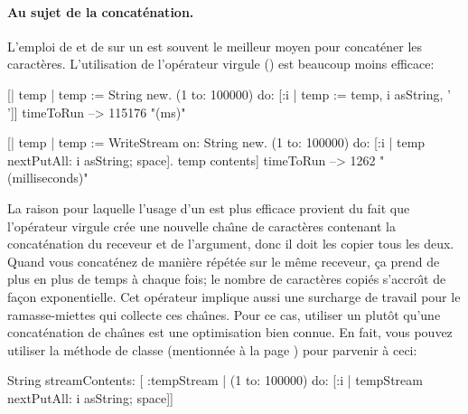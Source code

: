 \documentclass[a4paper,10pt,twoside]{book}
\begin{document}
\paragraph{Au sujet de la concat\'enation.}
L'emploi de  et de  sur un  est souvent le meilleur moyen pour concat\'ener 
les caract\`eres.
L'utilisation de l'op\'erateur virgule (\ct{,}) est beaucoup moins efficace:

\begin{code}{}
[| temp |
  temp := String new.
  (1 to: 100000)
    do: [:i | temp := temp, i asString, ' ']] timeToRun --> 115176 "(ms)"

[| temp |
  temp := WriteStream on: String new.
  (1 to: 100000)
    do: [:i | temp nextPutAll: i asString; space].
  temp contents] timeToRun --> 1262 "(milliseconds)"
\end{code}

La raison pour laquelle l'usage d'un \stream est plus efficace provient
du fait que l'op\'erateur virgule cr\'ee une nouvelle cha\^{\i}ne de caract\`eres
contenant la concat\'enation du receveur et de l'argument, donc il doit
les copier tous les deux.
Quand vous concat\'enez de mani\`ere r\'ep\'et\'ee sur le m\^eme receveur,
	  \c{c}a prend de plus en plus de temps \`a chaque fois; le nombre
	  de caract\`eres copi\'es s'accro\^{\i}t de fa\c{c}on exponentielle.
Cet op\'erateur implique aussi une surcharge de travail pour le ramasse-miettes qui collecte ces cha\^{\i}nes. 
Pour ce cas, utiliser un \stream plut\^ot qu'une concat\'enation de cha\^{\i}nes est une optimisation bien connue.
En fait, vous pouvez utiliser la m\'ethode de classe  (mentionn\'ee \`a la page \pageref{sec:streamContents}) pour parvenir \`a ceci:

\begin{code}{}
String streamContents: [ :tempStream |
  (1 to: 100000)
       do: [:i | tempStream nextPutAll: i asString; space]] 
\end{code}
\end{document}
